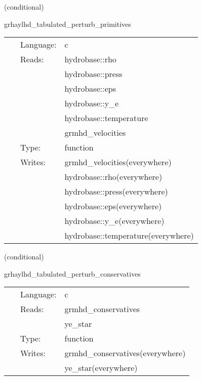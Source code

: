 \vspace{5mm}

   (conditional) 

\hspace{5mm} grhaylhd\_tabulated\_perturb\_primitives 

\hspace{5mm}{\it tabulated version of grhaylhd\_perturb\_primitives } 


\hspace{5mm}

 \begin{tabular*}{160mm}{cll} 
~ & Language:  & c \\ 
~ & Reads:  & hydrobase::rho \\ 
~& ~ &hydrobase::press\\ 
~& ~ &hydrobase::eps\\ 
~& ~ &hydrobase::y\_e\\ 
~& ~ &hydrobase::temperature\\ 
~& ~ &grmhd\_velocities\\ 
~ & Type:  & function \\ 
~ & Writes:  & grmhd\_velocities(everywhere) \\ 
~& ~ &hydrobase::rho(everywhere)\\ 
~& ~ &hydrobase::press(everywhere)\\ 
~& ~ &hydrobase::eps(everywhere)\\ 
~& ~ &hydrobase::y\_e(everywhere)\\ 
~& ~ &hydrobase::temperature(everywhere)\\ 
\end{tabular*} 


\vspace{5mm}

   (conditional) 

\hspace{5mm} grhaylhd\_tabulated\_perturb\_conservatives 

\hspace{5mm}{\it tabulated version of grhaylhd\_perturb\_conservatives } 


\hspace{5mm}

 \begin{tabular*}{160mm}{cll} 
~ & Language:  & c \\ 
~ & Reads:  & grmhd\_conservatives \\ 
~& ~ &ye\_star\\ 
~ & Type:  & function \\ 
~ & Writes:  & grmhd\_conservatives(everywhere) \\ 
~& ~ &ye\_star(everywhere)\\ 
\end{tabular*} 


